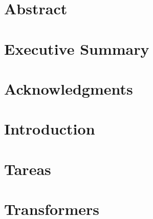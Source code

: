 \documentclass[12pt, oneside]{book}
\begin{document}
\chapter{Abstract}

\chapter{Executive Summary}


\chapter{Acknowledgments}


\tableofcontents

\listoffigures

\mainmatter

\chapter{Introduction}
% 

% 

\chapter{Tareas}



\chapter{Transformers}

\end{document}
